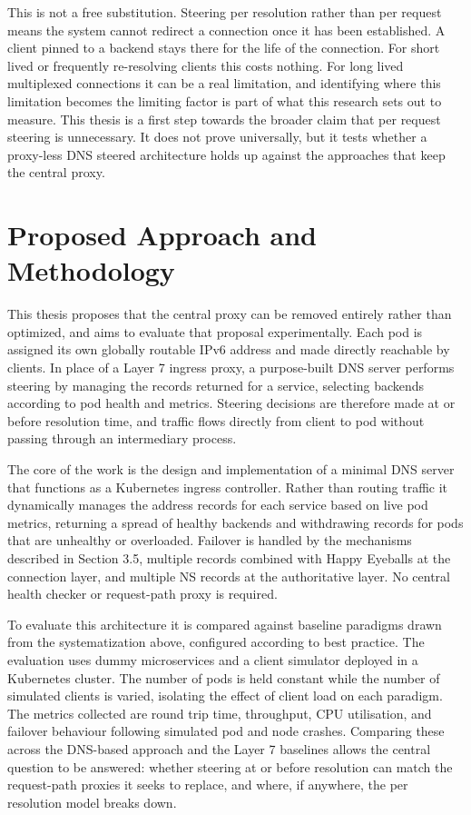 \documentclass[a4paper,11pt]{article}
\begin{document}
This is not a free substitution. Steering per resolution rather than per request means the system cannot redirect a connection once it has been established.
A client pinned to a backend stays there for the life of the connection. For short lived or frequently re-resolving clients this costs nothing. For long lived
multiplexed connections it can be a real limitation, and identifying where this limitation becomes the limiting factor is part of what this research
sets out to measure. This thesis is a first step towards the broader claim that per request steering is unnecessary. It does not
prove universally, but it tests whether a proxy-less DNS steered architecture holds up against the approaches that keep the central proxy.


\section{Proposed Approach and Methodology}
This thesis proposes that the central proxy can be removed entirely rather than optimized,
and aims to evaluate that proposal experimentally. Each pod is assigned its own globally routable 
IPv6 address and made directly reachable by clients. In place of a Layer 7 ingress proxy, 
a purpose-built DNS server performs steering by managing the records returned for a service, 
selecting backends according to pod health and metrics. 
Steering decisions are therefore made at or before resolution time, 
and traffic flows directly from client to pod without passing through an intermediary process. 

The core of the work is the design and implementation of a minimal DNS server that functions as a Kubernetes ingress controller. 
Rather than routing traffic it dynamically manages the address records for each service based on live pod metrics, 
returning a spread of healthy backends and withdrawing records for pods that are unhealthy or overloaded. 
Failover is handled by the mechanisms described in Section 3.5, multiple records combined with Happy Eyeballs at the connection layer, 
and multiple NS records at the authoritative layer. No central health checker or request-path proxy is required.

To evaluate this architecture it is compared against baseline paradigms drawn from the systematization above, configured according to best practice. 
The evaluation uses dummy microservices and a client simulator deployed in a Kubernetes cluster. 
The number of pods is held constant while the number of simulated clients is varied, isolating the effect of client load on each paradigm. 
The metrics collected are round trip time, throughput, CPU utilisation, and failover behaviour following simulated pod and node crashes. 
Comparing these across the DNS-based approach and the Layer 7 baselines allows the central question to be answered: 
whether steering at or before resolution can match the request-path proxies it seeks to replace, and where, if anywhere, the per resolution model breaks down.
\end{document}
